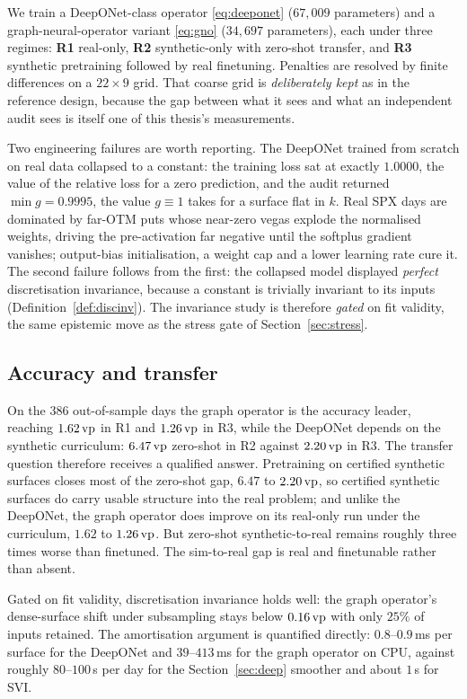 We train a DeepONet-class operator \eqref{eq:deeponet} ($67{,}009$ parameters) and a
graph-neural-operator variant \eqref{eq:gno} ($34{,}697$ parameters), each under three regimes:
\textbf{R1} real-only, \textbf{R2} synthetic-only with zero-shot transfer, and \textbf{R3}
synthetic pretraining followed by real finetuning. Penalties are resolved by finite differences
on a $22\times9$ grid. That coarse grid is \emph{deliberately kept} as in the reference design,
because the gap between what it sees and what an independent audit sees is itself one of this
thesis's measurements.

Two engineering failures are worth reporting. The DeepONet trained from scratch on real data
collapsed to a constant: the training loss sat at exactly $1.0000$, the value of the relative
loss for a zero prediction, and the audit returned $\min g=0.9995$, the value $g\equiv1$ takes
for a surface flat in $k$. Real SPX days are dominated by far-OTM puts whose near-zero vegas
explode the normalised weights, driving the pre-activation far negative until the softplus
gradient vanishes; output-bias initialisation, a weight cap and a lower learning rate cure it.
The second failure follows from the first: the collapsed model displayed \emph{perfect}
discretisation invariance, because a constant is trivially invariant to its inputs
(Definition~\ref{def:discinv}). The invariance study is therefore \emph{gated} on fit validity,
the same epistemic move as the stress gate of Section~\ref{sec:stress}.

\subsection{Accuracy and transfer}

On the $386$ out-of-sample days the graph operator is the accuracy leader, reaching
$1.62\,\text{vp}$ in R1 and $1.26\,\text{vp}$ in R3, while the DeepONet depends on the synthetic
curriculum: $6.47\,\text{vp}$ zero-shot in R2 against $2.20\,\text{vp}$ in R3. The transfer question
therefore receives a qualified answer. Pretraining on certified synthetic surfaces closes most of
the zero-shot gap, $6.47$ to $2.20\,\text{vp}$, so certified synthetic surfaces do carry usable
structure into the real problem; and unlike the DeepONet, the graph operator does improve on its
real-only run under the curriculum, $1.62$ to $1.26\,\text{vp}$. But zero-shot synthetic-to-real
remains roughly three times worse than finetuned. The sim-to-real gap is real and finetunable
rather than absent.

Gated on fit validity, discretisation invariance holds well: the graph operator's dense-surface
shift under subsampling stays below $0.16\,\text{vp}$ with only $25\%$ of inputs retained. The
amortisation argument is quantified directly: $0.8$--$0.9$\,ms per surface for the DeepONet and
$39$--$413$\,ms for the graph operator on CPU, against roughly $80$--$100$\,s per day for the
Section~\ref{sec:deep} smoother and about $1$\,s for SVI.

